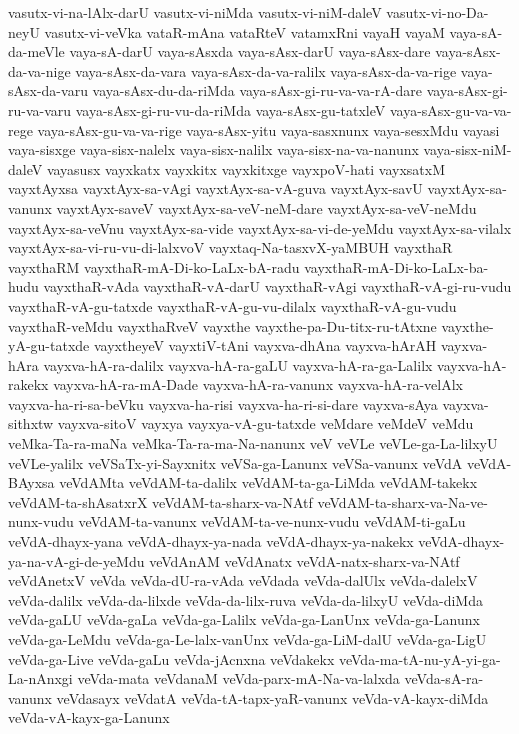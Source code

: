 {vasutx-vi-na-lAlx-darU
vasutx-vi-niMda
vasutx-vi-niM-daleV
vasutx-vi-no-Da-neyU
vasutx-vi-veVka
vataR-mAna
vataRteV
vatamxRni
vayaH
vayaM
vaya-sA-da-meVle
vaya-sA-darU
vaya-sAsxda
vaya-sAsx-darU
vaya-sAsx-dare
vaya-sAsx-da-va-nige
vaya-sAsx-da-vara
vaya-sAsx-da-va-ralilx
vaya-sAsx-da-va-rige
vaya-sAsx-da-varu
vaya-sAsx-du-da-riMda
vaya-sAsx-gi-ru-va-va-rA-dare
vaya-sAsx-gi-ru-va-varu
vaya-sAsx-gi-ru-vu-da-riMda
vaya-sAsx-gu-tatxleV
vaya-sAsx-gu-va-va-rege
vaya-sAsx-gu-va-va-rige
vaya-sAsx-yitu
vaya-sasxnunx
vaya-sesxMdu
vayasi
vaya-sisxge
vaya-sisx-nalelx
vaya-sisx-nalilx
vaya-sisx-na-va-nanunx
vaya-sisx-niM-daleV
vayasusx
vayxkatx
vayxkitx
vayxkitxge
vayxpoV-hati
vayxsatxM
vayxtAyxsa
vayxtAyx-sa-vAgi
vayxtAyx-sa-vA-guva
vayxtAyx-savU
vayxtAyx-sa-vanunx
vayxtAyx-saveV
vayxtAyx-sa-veV-neM-dare
vayxtAyx-sa-veV-neMdu
vayxtAyx-sa-veVnu
vayxtAyx-sa-vide
vayxtAyx-sa-vi-de-yeMdu
vayxtAyx-sa-vilalx
vayxtAyx-sa-vi-ru-vu-di-lalxvoV
vayxtaq-Na-tasxvX-yaMBUH
vayxthaR
vayxthaRM
vayxthaR-mA-Di-ko-LaLx-bA-radu
vayxthaR-mA-Di-ko-LaLx-ba-hudu
vayxthaR-vAda
vayxthaR-vA-darU
vayxthaR-vAgi
vayxthaR-vA-gi-ru-vudu
vayxthaR-vA-gu-tatxde
vayxthaR-vA-gu-vu-dilalx
vayxthaR-vA-gu-vudu
vayxthaR-veMdu
vayxthaRveV
vayxthe
vayxthe-pa-Du-titx-ru-tAtxne
vayxthe-yA-gu-tatxde
vayxtheyeV
vayxtiV-tAni
vayxva-dhAna
vayxva-hArAH
vayxva-hAra
vayxva-hA-ra-dalilx
vayxva-hA-ra-gaLU
vayxva-hA-ra-ga-Lalilx
vayxva-hA-rakekx
vayxva-hA-ra-mA-Dade
vayxva-hA-ra-vanunx
vayxva-hA-ra-velAlx
vayxva-ha-ri-sa-beVku
vayxva-ha-risi
vayxva-ha-ri-si-dare
vayxva-sAya
vayxva-sithxtw
vayxva-sitoV
vayxya
vayxya-vA-gu-tatxde
veMdare
veMdeV
veMdu
veMka-Ta-ra-maNa
veMka-Ta-ra-ma-Na-nanunx
veV
veVLe
veVLe-ga-La-lilxyU
veVLe-yalilx
veVSaTx-yi-Sayxnitx
veVSa-ga-Lanunx
veVSa-vanunx
veVdA
veVdA-BAyxsa
veVdAMta
veVdAM-ta-dalilx
veVdAM-ta-ga-LiMda
veVdAM-takekx
veVdAM-ta-shAsatxrX
veVdAM-ta-sharx-va-NAtf
veVdAM-ta-sharx-va-Na-ve-nunx-vudu
veVdAM-ta-vanunx
veVdAM-ta-ve-nunx-vudu
veVdAM-ti-gaLu
veVdA-dhayx-yana
veVdA-dhayx-ya-nada
veVdA-dhayx-ya-nakekx
veVdA-dhayx-ya-na-vA-gi-de-yeMdu
veVdAnAM
veVdAnatx
veVdA-natx-sharx-va-NAtf
veVdAnetxV
veVda
veVda-dU-ra-vAda
veVdada
veVda-dalUlx
veVda-dalelxV
veVda-dalilx
veVda-da-lilxde
veVda-da-lilx-ruva
veVda-da-lilxyU
veVda-diMda
veVda-gaLU
veVda-gaLa
veVda-ga-Lalilx
veVda-ga-LanUnx
veVda-ga-Lanunx
veVda-ga-LeMdu
veVda-ga-Le-lalx-vanUnx
veVda-ga-LiM-dalU
veVda-ga-LigU
veVda-ga-Live
veVda-gaLu
veVda-jAcnxna
veVdakekx
veVda-ma-tA-nu-yA-yi-ga-La-nAnxgi
veVda-mata
veVdanaM
veVda-parx-mA-Na-va-lalxda
veVda-sA-ra-vanunx
veVdasayx
veVdatA
veVda-tA-tapx-yaR-vanunx
veVda-vA-kayx-diMda
veVda-vA-kayx-ga-Lanunx
}

